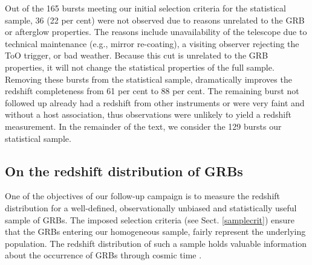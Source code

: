 \documentclass[longauth]{aa}    %
\begin{document}
Out of the 165 bursts meeting our initial selection criteria for the statistical
sample, 36 (22 per cent) were not observed due to reasons unrelated to the GRB
or afterglow properties. The reasons include unavailability of the telescope due
to technical maintenance (e.g., mirror re-coating), a visiting observer
rejecting the ToO trigger, or bad weather. Because this cut is unrelated to the
GRB properties, it will not change the statistical properties of the full
sample. Removing these bursts from the statistical sample, dramatically improves
the redshift completeness from 61 per cent to 88 per cent. The remaining burst
not followed up already had a redshift from other instruments or were very faint
and without a host association, thus observations were unlikely to yield a redshift
measurement. In the remainder of the text, we consider the 129 bursts our
statistical sample.

\subsection{On the redshift distribution of GRBs} \label{redshift}

One of the objectives of our follow-up campaign is to measure the redshift
distribution for a well-defined, observationally unbiased and statistically useful
sample of GRBs. The imposed selection criteria (see Sect. \ref{samplecrit})
ensure that the GRBs entering our homogeneous sample, fairly represent the
underlying population. The redshift distribution of such a sample holds valuable
information about the occurrence of GRBs through cosmic time
\citep{Jakobsson2012, Perley2016a}.


\end{document}
